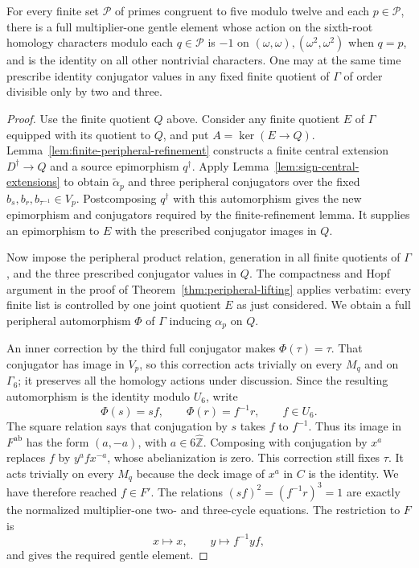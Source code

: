 \begin{theorem}
\label{thm:quadratic-sign-lifts}
For every finite set $\mathcal P$ of primes congruent to five modulo
twelve and each $p\in\mathcal P$, there is a full multiplier-one
gentle element whose action on the sixth-root homology characters
modulo each $q\in\mathcal P$ is $-1$ on
$(\omega,\omega),(\omega^2,\omega^2)$ when $q=p$, and is the
identity on all other nontrivial characters.
One may at the same time prescribe identity conjugator values in
any fixed finite quotient of $\Gamma$ of order divisible only by
two and three.
\end{theorem}

\begin{proof}
Use the finite quotient $Q$ above. Consider any finite quotient
$E$ of $\Gamma$ equipped with its quotient to $Q$, and put
$A=\ker(E\to Q)$. Lemma~\ref{lem:finite-peripheral-refinement}
constructs a finite central extension $D^\dagger\to Q$ and a
source epimorphism $q^\dagger$. Apply
Lemma~\ref{lem:sign-central-extensions} to obtain
$\widetilde\alpha_p$ and three peripheral conjugators over the
fixed $b_s,b_r,b_{\tau^{-1}}\in V_p$. Postcomposing $q^\dagger$
with this automorphism gives the new epimorphism and conjugators
required by the finite-refinement lemma. It supplies an epimorphism
to $E$ with the prescribed conjugator images in $Q$.

Now impose the peripheral product relation, generation in all finite
quotients of $\Gamma$, and the three prescribed conjugator values in
$Q$. The compactness and Hopf argument in the proof of
Theorem~\ref{thm:peripheral-lifting} applies verbatim: every finite
list is controlled by one joint quotient $E$ as just considered.
We obtain a full peripheral automorphism $\Phi$ of $\Gamma$
inducing $\alpha_p$ on $Q$.

An inner correction by the third full conjugator makes $\Phi(\tau)=\tau$.
That conjugator has image in $V_p$, so this correction acts trivially
on every $M_q$ and on $\Gamma_6$; it preserves all the homology
actions under discussion. Since the resulting automorphism is the
identity modulo $U_6$, write
\[
 \Phi(s)=sf,\qquad \Phi(r)=f^{-1}r,
       \qquad f\in U_6.
\]
The square relation says that conjugation by $s$ takes $f$ to $f^{-1}$.
Thus its image in $F^{\mathrm{ab}}$ has the form $(a,-a)$, with
$a\in6\widehat{\mathbb Z}$. Composing with conjugation by $x^a$
replaces $f$ by $y^af x^{-a}$, whose abelianization is zero.
This correction still fixes $\tau$. It acts trivially on every
$M_q$ because the deck image of $x^a$ in $C$ is the identity.
We have therefore reached $f\in F'$. The relations
$(sf)^2=(f^{-1}r)^3=1$ are exactly the normalized multiplier-one
two- and three-cycle equations. The restriction to $F$ is
\[
 x\longmapsto x,\qquad y\longmapsto f^{-1}yf,
\]
and gives the required gentle element.


\end{proof}
